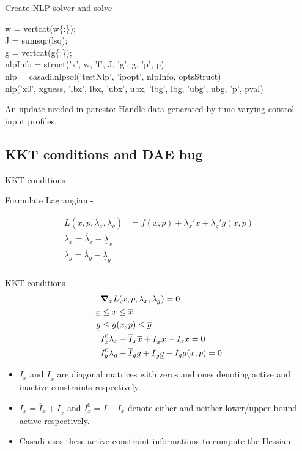 \documentclass[xcolor=dvipsnames, 8pt]{beamer} %
\newcommand{\code}[1]{{\fontfamily{qcr}\selectfont#1}}
\begin{document}
\begin{frame}{Create NLP solver and solve}
	
	\medskip
	
	\code{w = vertcat(w\{:\});} \\
	\code{J = sumsqr(lsq);} \\
	\code{g = vertcat(g\{:\});} \\
	\code{nlpInfo = struct('x', w, 'f', J, 'g', g, 'p', p)} \\
	\medskip
	\code{nlp = casadi.nlpsol('testNlp', 'ipopt', nlpInfo, optsStruct)} \\
	\medskip
	\code{nlp('x0', xguess, 'lbx', lbx, 'ubx', ubx, 'lbg', lbg, 'ubg', ubg, 
	'p', pval)} \\
	\medskip
	
An update needed in paresto: Handle data generated by time-varying control 
input profiles.
\end{frame}		

\subsection{KKT conditions and DAE bug}
\begin{frame}{KKT conditions}
	
Formulate Lagrangian \citep{andersson:rawlings:2018} - 
	
\begin{align*}
L(x, p, \lambda_x, \lambda_g) &= f(x, p) + \lambda_x' x + \lambda_g'g(x, p) \\
\lambda_x = \overline{\lambda}_x - \underline{\lambda}_x \\
\lambda_g = \overline{\lambda}_g - \underline{\lambda}_g \\
\end{align*}

KKT conditions - 
\begin{align*}
&\grad_x L(x, p, \lambda_x, \lambda_g) =0 \\
\underline{x} &\leq x \leq \overline{x} \\
\underline{g} &\leq g(x, p) \leq \overline{g} \\
&I^0_x \lambda_x + \overline{I}_x\overline{x} + \underline{I}_x\underline{x} - 
I_xx = 0 \\
&I^0_g \lambda_g + \overline{I}_g\overline{g} + \underline{I}_g\underline{g} - 
I_gg(x, p) = 0
\end{align*}

\begin{itemize}
	\item $\overline{I}_x$ and $\underline{I}_x$ are diagonal matrices with 
	zeros and ones denoting active and inactive constraints respectively.
	\item $I_x = \overline{I}_x + \underline{I}_x$ and $I^0_x = I - I_x$ denote 
	either and neither lower/upper bound active respectively.
	\item Casadi uses these active constraint informations to compute the 
	Hessian.
\end{itemize}

\end{frame}	
\end{document}
